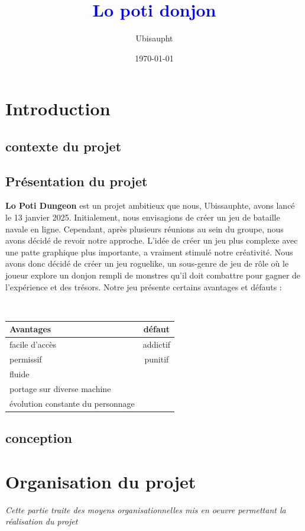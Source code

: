\documentclass[a4paper,11pt]{article}
\begin{document}
\title{\huge{\textbf{\textcolor{blue}{Lo poti donjon}}}}
\author{\Large{Ubisaupht}}
\date{\today}
\maketitle
\newpage
\tableofcontents
\newpage


\section{Introduction}
\subsection{contexte du projet}
\subsection{Présentation du projet}

\textbf{Lo Poti Dungeon} est un projet ambitieux que nous, \mbox{Ubissauphte}, avons lancé le 13 janvier 2025. Initialement, nous envisagions de créer 
un jeu de bataille navale en ligne. Cependant, après plusieurs réunions au sein du groupe, nous avons décidé de revoir notre approche. 
L'idée de créer un jeu plus complexe avec une patte graphique plus importante, a vraiment stimulé notre créativité.
Nous avons donc décidé de créer un jeu roguelike, un sous-genre de jeu de rôle où le joueur explore 
un donjon rempli de monstres qu'il doit combattre pour gagner de l'expérience et des trésors. Notre jeu présente certains avantages et défauts :

\\
\begin{center}
\begin{tabular}{|l|c|}
 \hline \textbf{Avantages} & \textbf{défaut} \\
 \hline facile d'accès & addictif \\ 
 \hline permissif & punitif \\ 
 \hline fluide & \\
 \hline portage sur diverse machine & \\
 \hline évolution constante du personnage & \\
 \hline 
\end{tabular}
\end{center}
\subsection{conception}
\newpage
\section{Organisation du projet}
\textit{Cette partie traite des moyens organisationnelles mis en oeuvre \mbox{permettant} la réalisation du projet}
\end{document}
